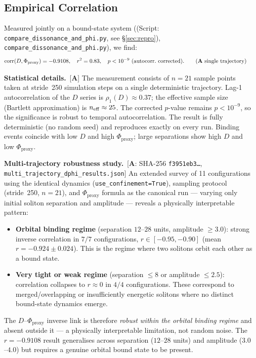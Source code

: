 \documentclass[12pt]{article}
\newcommand{\CatA}{\textbf{A}}
\begin{document}
\subsection{Empirical Correlation}
Measured jointly on a bound-state system ((Script: \texttt{compare\_dissonance\_and\_phi.py}, see \S\ref{sec:repro}), \texttt{compare\_dissonance\_and\_phi.py}), we find:
\begin{align*}
\mathrm{corr}(D,\Phi_{\mathrm{proxy}}) &= -0.9108,\quad r^2 = 0.83,\quad p<10^{-9}\ \text{(autocorr.\ corrected)}. \tag{$\CatA$ single trajectory}
\end{align*}
\begin{sloppypar}
\noindent\textbf{Statistical details.}~[$\CatA$] The measurement consists of $n=21$ sample points taken at stride~250 simulation steps on a single deterministic trajectory. Lag-1 autocorrelation of the $D$ series is $\rho_1(D)\approx 0.37$; the effective sample size (Bartlett approximation) is $n_{\rm eff}\approx 25$. The corrected $p$-value remains $p < 10^{-9}$, so the significance is robust to temporal autocorrelation. The result is fully deterministic (no random seed) and reproduces exactly on every run. Binding events coincide with low $D$ and high $\Phi_{\mathrm{proxy}}$; large separations show high $D$ and low $\Phi_{\mathrm{proxy}}$.
\end{sloppypar}

\begin{sloppypar}
\noindent\textbf{Multi-trajectory robustness study.}~[$\CatA$: SHA-256 \texttt{f3951eb3\ldots},
\texttt{multi\_trajectory\_dphi\_results.json}]
An extended survey of 11 configurations using the identical dynamics (\texttt{use\_confinement=True}), sampling protocol (stride~250, $n=21$), and $\Phi_{\mathrm{proxy}}$ formula as the canonical run — varying only initial soliton separation and amplitude — reveals a physically interpretable pattern:
\begin{itemize}[nosep]
  \item \textbf{Orbital binding regime} (separation $12$--$28$ units, amplitude $\geq 3.0$): strong inverse correlation in $7/7$ configurations, $r \in [-0.95, -0.90]$ (mean $r = -0.924 \pm 0.024$). This is the regime where two solitons orbit each other as a bound state.
  \item \textbf{Very tight or weak regime} (separation $\leq 8$ or amplitude $\leq 2.5$): correlation collapses to $r \approx 0$ in $4/4$ configurations. These correspond to merged/overlapping or insufficiently energetic solitons where no distinct bound-state dynamics emerge.
\end{itemize}
The $D$--$\Phi_{\mathrm{proxy}}$ inverse link is therefore \emph{robust within the orbital binding regime} and absent outside it --- a physically interpretable limitation, not random noise. The $r=-0.9108$ result generalises across separation ($12$--$28$ units) and amplitude ($3.0$--$4.0$) but requires a genuine orbital bound state to be present.
\end{sloppypar}
\end{document}
